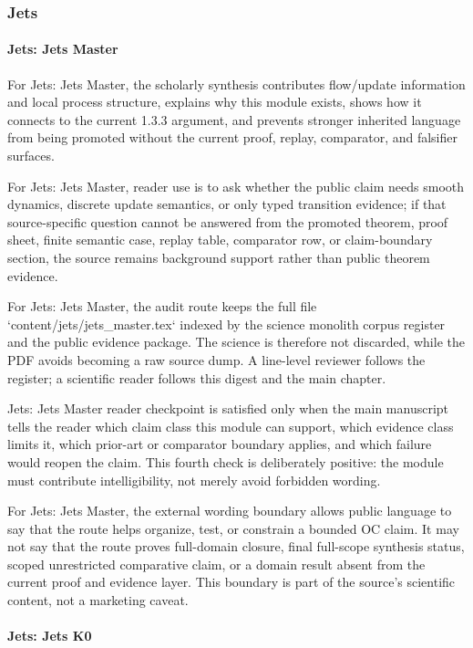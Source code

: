 \subsubsection{Jets}

\paragraph{Jets: Jets Master}

For Jets: Jets Master, the scholarly synthesis contributes flow/update information and local process structure, explains why this module exists, shows how it connects to the current 1.3.3 argument, and prevents stronger inherited language from being promoted without the current proof, replay, comparator, and falsifier surfaces.


For Jets: Jets Master, reader use is to ask whether the public claim needs smooth dynamics, discrete update semantics, or only typed transition evidence; if that source-specific question cannot be answered from the promoted theorem, proof sheet, finite semantic case, replay table, comparator row, or claim-boundary section, the source remains background support rather than public theorem evidence.


For Jets: Jets Master, the audit route keeps the full file `content/jets/jets\_master.tex` indexed by the science monolith corpus register and the public evidence package. The science is therefore not discarded, while the PDF avoids becoming a raw source dump. A line-level reviewer follows the register; a scientific reader follows this digest and the main chapter.


Jets: Jets Master reader checkpoint is satisfied only when the main manuscript tells the reader which claim class this module can support, which evidence class limits it, which prior-art or comparator boundary applies, and which failure would reopen the claim. This fourth check is deliberately positive: the module must contribute intelligibility, not merely avoid forbidden wording.


For Jets: Jets Master, the external wording boundary allows public language to say that the route helps organize, test, or constrain a bounded OC claim. It may not say that the route proves full-domain closure, final full-scope synthesis status, scoped unrestricted comparative claim, or a domain result absent from the current proof and evidence layer. This boundary is part of the source's scientific content, not a marketing caveat.


\paragraph{Jets: Jets K0}

